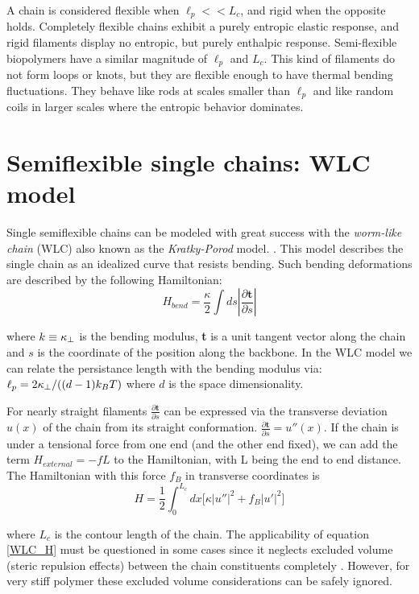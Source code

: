 A chain is considered flexible when $\ell_p<<L_c$, and rigid when the opposite
holds. Completely flexible chains exhibit a purely entropic elastic
response, and rigid filaments display no entropic, but purely enthalpic
response. Semi-flexible biopolymers have a similar magnitude of $\ell_p$ and
$L_c$. This kind of filaments do not form loops or knots, but they are
flexible enough to have thermal bending
fluctuations\citep{storm_nonlinear_2005}. They behave like rods at scales
smaller than $\ell_p$ and like random coils in larger scales where the entropic behavior
dominates.

\section{Semiflexible single chains: WLC model}
Single semiflexible chains can be modeled with great success with the
\emph{worm-like chain} (WLC) also known as the \emph{Kratky-Porod} model.
\citep{rubinstein_polymer_2003, schuster_hierarchical_2011}. This model
describes the single chain as an idealized curve that resists bending. Such
bending deformations are described by the following Hamiltonian:
$$H_{bend}=\frac{\kappa}{2} \int ds|\frac{\partial \textbf{t}}{\partial s}|$$

where $k\equiv\kappa_\perp{}$ is the bending modulus, \textbf{t} is a unit tangent
vector along the chain and $s$ is the coordinate of the position along the
backbone. In the WLC model we can relate the persistance length with the bending
modulus via: $\ell_p{}=2\kappa_\perp{}/((d-1)k_B{}T)$ where $d$ is the space
dimensionality.

For nearly straight filaments $\frac{\partial \textbf{t}}{\partial s}$ can be
expressed via the transverse deviation $u(x)$ of the chain from its straight
conformation. $\frac{\partial \textbf{t}}{\partial s}=u''(x)$. If the chain is
under a tensional force from one end (and the other end fixed), we can add the
term $H_{external}=-fL$ to the Hamiltonian, with L being the end to end
distance.
The Hamiltonian with this force $f_B$ in transverse coordinates is
\begin{equation}\label{WLC_H}
H=\frac{1}{2}\int_0^{L_c} dx\Big[\kappa|u''|^2 + f_B|u'|^2\Big]
\end{equation}

where $L_c$ is the contour length of the chain.
The applicability of equation \ref{WLC_H} must be questioned in some cases since
it neglects excluded volume (steric repulsion effects) between the
chain constituents completely \citep{hsu_breakdown_2011}. However, for very stiff
polymer these excluded volume considerations can be safely ignored.

